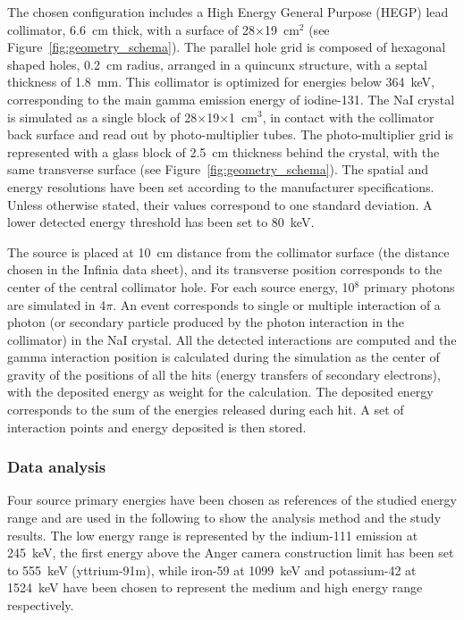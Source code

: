 The chosen configuration includes a High Energy General Purpose (HEGP) lead collimator, 6.6~cm thick, with a surface of 28$\times$19~cm$^{2}$ (see Figure~\ref{fig:geometry_schema}). The parallel hole grid is composed of hexagonal shaped holes, 0.2~cm radius, arranged in a quincunx structure, with a septal thickness of 1.8~mm. This collimator is optimized for energies below 364~keV, corresponding to the main gamma emission energy of iodine-131. The NaI crystal is simulated as a single block of 28$\times$19$\times$1~cm$^{3}$, in contact with the collimator back surface and read out by photo-multiplier tubes. The photo-multiplier grid is represented with a glass block of 2.5~cm thickness behind the crystal, with the same transverse surface (see Figure~\ref{fig:geometry_schema}). The spatial and energy resolutions have been set according to the manufacturer specifications. Unless otherwise stated, their values correspond to one standard deviation. A lower detected energy threshold has been set to 80~keV.

The source is placed at 10~cm distance from the collimator surface (the distance chosen in the Infinia data sheet), and its transverse position corresponds to the center of the central collimator hole. For each source energy, 10$^{8}$ primary photons are simulated in 4$\pi$. An event corresponds to single or multiple interaction of a photon (or secondary particle produced by the photon interaction in the collimator) in the NaI crystal. All the detected interactions are computed and the gamma interaction position is calculated during the simulation as the center of gravity of the positions of all the hits (energy transfers of secondary electrons), with the deposited energy as weight for the calculation. The deposited energy corresponds to the sum of the energies released during each hit. A set of interaction points and energy deposited is then stored. 


\subsubsection{Data analysis}\label{AC_dataTreat}
Four source primary energies have been chosen as references of the studied energy range and are used in the following to show the analysis method and the study results. The low energy range is represented by the indium-111 emission at 245~keV, the first energy above the Anger camera construction limit has been set to 555~keV (yttrium-91m), while iron-59 at 1099~keV and potassium-42 at 1524~keV have been chosen to represent the medium and high energy range respectively. 

